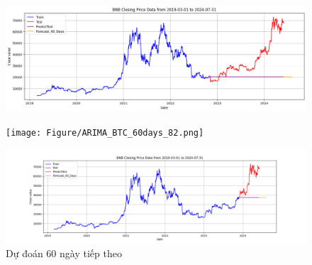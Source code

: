 \documentclass[conference]{IEEEtran}
\begin{document}
	\begin{figure}[H]
		\centering
		\begin{minipage}{0.15\textwidth}
			\centering
			\includegraphics[width=1\textwidth]{Figure/ARIMA_BTC_60days_73.png}
		\end{minipage}
		\hfill
		\begin{minipage}{0.15\textwidth}
			\centering
			\texttt{[image: Figure/ARIMA\_BTC\_60days\_82.png]}
		\end{minipage}
		\hfill
		\begin{minipage}{0.15\textwidth}
			\centering
			\includegraphics[width=1\textwidth]{Figure/ARIMA_BTC_60days_91.png}
		\end{minipage}
		\caption{Dự đoán 60 ngày tiếp theo}
		\label{fig:1}
	\end{figure}
	
\end{document}
